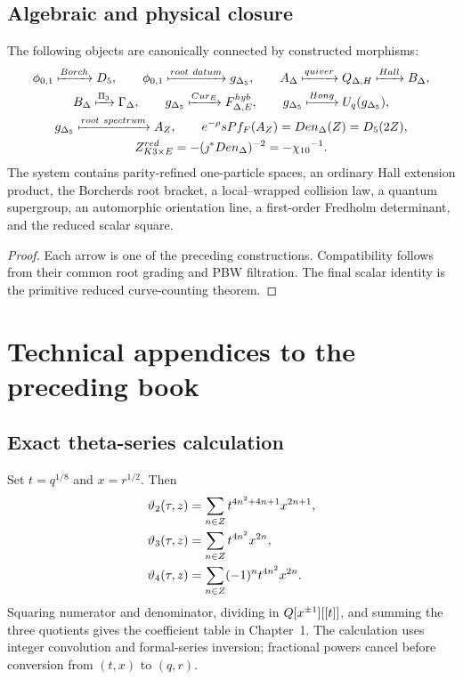 \chapter{Algebraic and physical closure}
\begin{theorem}
The following objects are canonically connected by constructed morphisms:
\[
\begin{gathered}
 {\phi_{0,1}}\xmapsto{Borch}{D_5},
 \qquad
 {\phi_{0,1}}\xmapsto{root\ datum}{g_{\Delta_5}},
 \qquad
 A_\Delta\xmapsto{quiver}Q_{\Delta,H}
 \xmapsto{Hall}B_\Delta,\\
 B_\Delta\xmapsto{\Pi_3}\Gamma_\Delta,
 \qquad
 {g_{\Delta_5}}\xmapsto{Cur_E}F^{hyb}_{\Delta,E},
 \qquad
 {g_{\Delta_5}}\xmapsto{Hong}U_q({g_{\Delta_5}}),\\
 {g_{\Delta_5}}\xmapsto{root\ spectrum}A_Z,
 \qquad
 e^{-\rho}sPf_F(A_Z)=Den_{\Delta}(Z)={D_5}(2Z),\\
 Z^{red}_{K3\times E}=-(\jmath^*Den_{\Delta})^{-2}=-{\chi_{10}}^{-1}.
\end{gathered}
\]
The system contains parity-refined one-particle spaces, an ordinary Hall extension product, the Borcherds root bracket, a local--wrapped collision law, a quantum supergroup, an automorphic orientation line, a first-order Fredholm determinant, and the reduced scalar square.
\end{theorem}
\begin{proof}
Each arrow is one of the preceding constructions.  Compatibility follows from their common root grading and PBW filtration.  The final scalar identity is the primitive reduced curve-counting theorem.
\end{proof}


\part{Technical appendices to the preceding book}
\chapter{Exact theta-series calculation}\label{app:theta-computation}
Set $t=q^{1/8}$ and $x=r^{1/2}$. Then
\[
\begin{aligned}
\vartheta_2(\tau,z)&=\sum_{n\in Z}t^{4n^2+4n+1}x^{2n+1},\\
\vartheta_3(\tau,z)&=\sum_{n\in Z}t^{4n^2}x^{2n},\\
\vartheta_4(\tau,z)&=\sum_{n\in Z}(-1)^nt^{4n^2}x^{2n}.
\end{aligned}
\]
Squaring numerator and denominator, dividing in $Q[x^{\pm1}][[t]]$, and summing the three quotients gives the coefficient table in Chapter~1. The calculation uses integer convolution and formal-series inversion; fractional powers cancel before conversion from $(t,x)$ to $(q,r)$.

